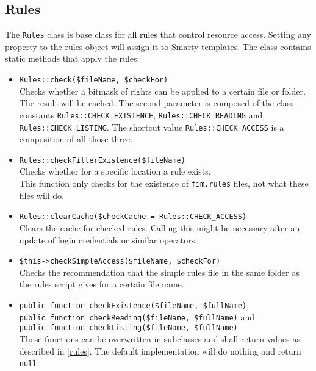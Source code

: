 \documentclass{scrartcl}
\begin{document}
   \subsection{Rules}
      The \lstinline!Rules! class is base class for all rules that control resource access. Setting any property to the rules object will assign it to Smarty templates. The class contains static methods that apply the rules:
      \begin{itemize}
         \item \lstinline!Rules::check($fileName, $checkFor)! \\
            Checks whether a bitmask of rights can be applied to a certain file or folder. The result will be cached. The second parameter is composed of the class constants \lstinline!Rules::CHECK_EXISTENCE!, \lstinline!Rules::CHECK_READING! and \lstinline!Rules::CHECK_LISTING!. The shortcut value \lstinline!Rules::CHECK_ACCESS! is a composition of all those three.
         \item \lstinline!Rules::checkFilterExistence($fileName)! \\
            Checks whether for a specific location a rule exists. \\
            This function only checks for the existence of \texttt{fim.rules} files, not what these files will do.
         \item \lstinline!Rules::clearCache($checkCache = Rules::CHECK_ACCESS)! \\
            Clears the cache for checked rules. Calling this might be necessary after an update of login credentials or similar operators.
         \item \lstinline!$this->checkSimpleAccess($fileName, $checkFor)! \\
            Checks the recommendation that the simple rules file in the same folder as the rules script gives for a certain file name.
         \item \lstinline!public function checkExistence($fileName, $fullName)!, \\ \lstinline!public function checkReading($fileName, $fullName)! and \\ \lstinline!public function checkListing($fileName, $fullName)! \\
            Those functions can be overwritten in subclasses and shall return values as described in \autoref{rules}. The default implementation will do nothing and return \lstinline!null!.
      \end{itemize}
\end{document}
